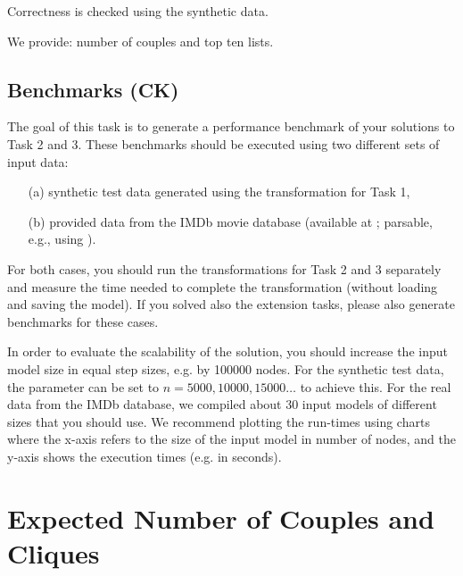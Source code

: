 \documentclass[a4paper,11pt]{article}
\begin{document}
Correctness is checked using the synthetic data.

We provide: number of couples and top ten lists.

\subsection{Benchmarks (CK)}

The goal of this task is to generate a performance benchmark
of your solutions to Task 2 and 3. These benchmarks should be
executed using two different sets of input data:
\begin{enumerate}
\item[(a)] synthetic test data generated using the transformation for Task 1, 
\item[(b)] provided data from the IMDb movie database (available at \cite{IMDBDATA}; parsable, e.g., using \cite{IMDB2EMF}).
\end{enumerate}
For both cases, you should run the transformations for Task 2 and 3
separately and measure the time needed to complete the transformation 
(without loading and saving the model).
If you solved also the extension tasks, please also generate benchmarks
for these cases.


In order to evaluate the scalability of the solution, you should
increase the input model size in equal step sizes, e.g. by 
100000 nodes. For the synthetic test data, the parameter can be
set to $n=5000, 10000, 15000\ldots$ to achieve this. For the
real data from the IMDb database, we compiled about 30 input 
models of different sizes that you should use.
We recommend plotting the run-times using charts where
the x-axis refers to the size of the input model in number of nodes,
and the y-axis shows the execution times (e.g. in seconds).





\newpage
\appendix

\section{Expected Number of Couples and Cliques}
\label{sec:expected-numbers}
\end{document}
